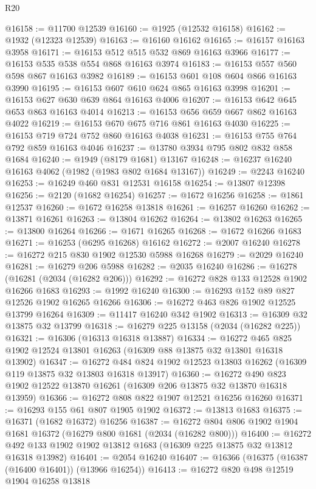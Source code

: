 \begin{lexlean}{R20}
\begin{coremodule}
@16158 := @11700 @12539
@16160 := @1925 (@12532 @16158)
@16162 := @1932 (@12323 @12539)
@16163 := @16160 @16162
@16165 := @16157 @16163 @3958
@16171 := @16153 @512 @515 @532 @869 @16163 @3966
@16177 := @16153 @535 @538 @554 @868 @16163 @3974
@16183 := @16153 @557 @560 @598 @867 @16163 @3982
@16189 := @16153 @601 @108 @604 @866 @16163 @3990
@16195 := @16153 @607 @610 @624 @865 @16163 @3998
@16201 := @16153 @627 @630 @639 @864 @16163 @4006
@16207 := @16153 @642 @645 @653 @863 @16163 @4014
@16213 := @16153 @656 @659 @667 @862 @16163 @4022
@16219 := @16153 @670 @675 @716 @861 @16163 @4030
@16225 := @16153 @719 @724 @752 @860 @16163 @4038
@16231 := @16153 @755 @764 @792 @859 @16163 @4046
@16237 := @13780 @3934 @795 @802 @832 @858 @1684
@16240 := @1949 (@8179 @1681) @13167
@16248 := @16237 @16240 @16163 @4062 (@1982 (@1983 @802 @1684 @13167))
@16249 := @2243 @16240
@16253 := @16249 @460 @831 @12531 @16158
@16254 := @13807 @12398
@16256 := @2120 (@1682 @16254)
@16257 := @1672 @16256
@16258 := @1861 @12537
@16260 := @1672 @16258 @13818
@16261 := @16257 @16260
@16262 := @13871 @16261
@16263 := @13804 @16262
@16264 := @13802 @16263
@16265 := @13800 @16264
@16266 := @1671 @16265
@16268 := @1672 @16266 @1683
@16271 := @16253 (@6295 @16268) @16162
@16272 := @2007 @16240
@16278 := @16272 @215 @830 @1902 @12530 @5988 @16268
@16279 := @2029 @16240
@16281 := @16279 @206 @5988
@16282 := @2035 @16240
@16286 := @16278 (@16281 (@2034 (@16282 @206)))
@16292 := @16272 @828 @133 @12528 @1902 @16266 @1683
@16293 := @1992 @16240
@16300 := @16293 @152 @89 @827 @12526 @1902 @16265 @16266
@16306 := @16272 @463 @826 @1902 @12525 @13799 @16264
@16309 := @11417 @16240 @342 @1902
@16313 := @16309 @32 @13875 @32 @13799
@16318 := @16279 @225 @13158 (@2034 (@16282 @225))
@16321 := @16306 (@16313 @16318 @13887)
@16334 := @16272 @465 @825 @1902 @12524 @13801 @16263 (@16309 @88 @13875 @32 @13801 @16318 @13902)
@16347 := @16272 @484 @824 @1902 @12523 @13803 @16262 (@16309 @119 @13875 @32 @13803 @16318 @13917)
@16360 := @16272 @490 @823 @1902 @12522 @13870 @16261 (@16309 @206 @13875 @32 @13870 @16318 @13959)
@16366 := @16272 @808 @822 @1907 @12521 @16256 @16260
@16371 := @16293 @155 @61 @807 @1905 @1902
@16372 := @13813 @1683
@16375 := @16371 (@1682 @16372) @16256
@16387 := @16272 @804 @806 @1902 @1904 @1681 @16372 (@16279 @800 @1681 (@2034 (@16282 @800)))
@16400 := @16272 @492 @133 @1902 @1902 @13812 @1683 (@16309 @225 @13875 @32 @13812 @16318 @13982)
@16401 := @2054 @16240
@16407 := @16366 (@16375 (@16387 (@16400 @16401)) (@13966 @16254))
@16413 := @16272 @820 @498 @12519 @1904 @16258 @13818

\end{coremodule}
\end{lexlean}
